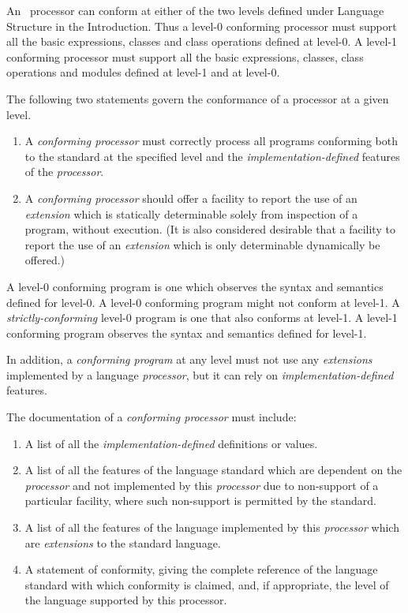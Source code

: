%
\begin{optDefinition}
An \eulisp\ processor can conform at either of the
two levels defined under Language Structure in the Introduction.
Thus a level-0 conforming processor
must support all the basic expressions, classes and class operations
defined at level-0.  A level-1
conforming processor must support all the basic expressions, classes,
class operations and modules defined at level-1 and at level-0.

The following two statements govern the conformance of a processor at a given
level.
\begin{enumerate}
    \item A {\em conforming processor\/} must correctly process all programs
    conforming both to the standard at the specified level and the {\em
        implementation-defined} features of the {\em processor}.
    \item A {\em conforming processor\/} should offer a facility to report the
    use of an {\em extension} which is statically determinable solely from
    inspection of a program, without execution.  (It is also considered
    desirable that a facility to report the use of an {\em extension} which is
    only determinable dynamically be offered.)
\end{enumerate}
%
A level-0 conforming program is one which
observes the syntax and semantics defined for level-0.  A level-0 conforming
program might not conform at level-1.  A {\em strictly-conforming\/} level-0
program is one that also conforms at level-1.  A level-1 conforming program
observes the syntax and semantics defined for level-1.

In addition, a {\em conforming program\/} at any level must not use any {\em
    extensions\/} implemented by a language {\em processor\/}, but it can rely
on {\em implementation-defined\/} features.

\noindent
The documentation of a {\em conforming processor\/} must include:
\begin{enumerate}
    \item A list of all the {\em implementation-defined\/} definitions or
    values.
    \item A list of all the features of the language standard which are
    dependent on the {\em processor\/} and not implemented by this {\em
        processor\/} due to non-support of a particular facility, where such
    non-support is permitted by the standard.
    \item A list of all the features of the language implemented by this {\em
        processor\/} which are {\em extensions\/} to the standard language.
    \item A statement of conformity, giving the complete reference of the
    language standard with which conformity is claimed, and, if appropriate, the
    level of the language supported by this processor.
\end{enumerate}
\end{optDefinition}
